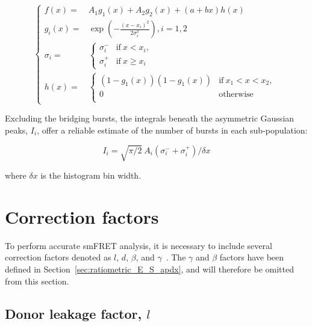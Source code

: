 \begin{equation}
\label{eqn:two_bridged_peaks_model}
\begin{cases}
f(x) = & A_1 g_1(x) + A_2 g_2(x) + (a + bx) h(x) \\

g_i(x) = & \exp \left(- \frac{(x - x_i)^2}{2 \sigma_i^2} \right), i = 1, 2 \\

\sigma_i = &
\begin{cases}
\sigma_i^- & \text{if}~x < x_i,\\
\sigma_i^+ & \text{if}~x \geq x_i
\end{cases} \\

h(x) = &
\begin{cases}
\left(1-g_1(x) \right) \left(1-g_1(x) \right) & \text{if}~x_1 < x < x_2,\\
0 & \text{otherwise} \\
\end{cases}
\end{cases}
\end{equation}

Excluding the bridging bursts, the integrals beneath the asymmetric Gaussian peaks, $I_i$, offer a reliable estimate of the number of bursts in each sub-population:

\begin{equation}
\label{eqn:AG_peak_integral}
I_i = \sqrt{\pi/2}~A_i \left(\sigma_i^- + \sigma_i^+ \right)/\delta x
\end{equation}

\noindent
where $\delta x$ is the histogram bin width.


\section{Correction factors}
\label{sec:correction_factors}

To perform accurate \ac{smFRET} analysis, it is necessary to include 
several correction factors denoted as $l$, $d$, $\beta$, and $\gamma$~\cite{lee_BPJ_2005}.
The $\gamma$ and $\beta$ factors have been defined in Section~\ref{sec:ratiometric_E_S_apdx}, and will therefore be omitted from this section.

\subsection{Donor leakage factor, $l$}
\label{sec:lk_apdx}

